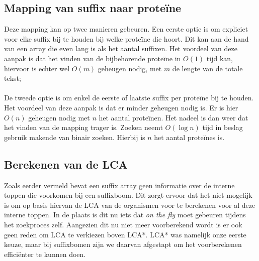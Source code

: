 \subsection{Mapping van suffix naar proteïne}\label{subsec:mapping-van-suffix-naar-proteine}
Deze mapping kan op twee manieren gebeuren.
Een eerste optie is om expliciet voor elke suffix bij te houden bij welke proteïne die hoort.
Dit kan aan de hand van een array die even lang is als het aantal suffixen.
Het voordeel van deze aanpak is dat het vinden van de bijbehorende proteïne in $O(1)$ tijd kan, hiervoor is echter wel $O(m)$ geheugen nodig, met $m$ de lengte van de totale tekst;
\\ \\
De tweede optie is om enkel de eerste of laatste suffix per proteïne bij te houden.
Het voordeel van deze aanpak is dat er minder geheugen nodig is.
Er is hier $O(n)$ geheugen nodig met $n$ het aantal proteïnen.
Het nadeel is dan weer dat het vinden van de mapping trager is.
Zoeken neemt $O(\log n)$ tijd in beslag gebruik makende van binair zoeken.
Hierbij is $n$ het aantal proteïnes is.

\subsection{Berekenen van de LCA}\label{subsec:berekenen-van-de-lca}
Zoals eerder vermeld bevat een suffix array geen informatie over de interne toppen die voorkomen bij een suffixboom.
Dit zorgt ervoor dat het niet mogelijk is om op basis hiervan de LCA van de organismen voor te berekenen voor al deze interne toppen.
In de plaats is dit nu iets dat \textit{on the fly} moet gebeuren tijdens het zoekproces zelf.
Aangezien dit nu niet meer voorberekend wordt is er ook geen reden om LCA te verkiezen boven LCA*.
LCA* was namelijk onze eerste keuze, maar bij suffixbomen zijn we daarvan afgestapt om het voorberekenen efficiënter te kunnen doen.



